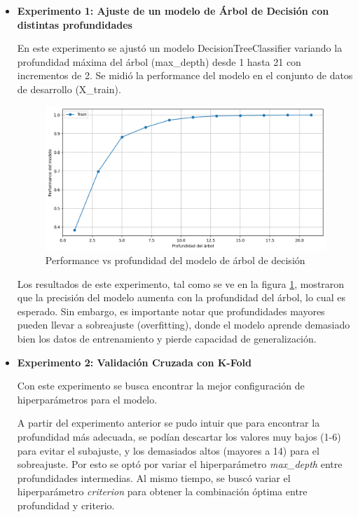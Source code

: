 \documentclass[11pt,a4paper, twocolumn]{article}
\begin{document}
\begin{itemize}
	\item[]
		\textbf{Experimento 1: Ajuste de un modelo de Árbol de Decisión con distintas profundidades}

En este experimento se ajustó un modelo DecisionTreeClassifier variando la profundidad máxima del árbol (max\_depth) desde 1 hasta 21 con incrementos de 2. Se midió la performance del modelo en el conjunto de datos de desarrollo (X\_train).

\begin{figure}[H]
	\centering
	\includegraphics[scale=0.6]{figuras/3b.png}
	\caption{Performance vs profundidad del modelo de árbol de decisión}
	\label{fig:3b}
\end{figure}

Los resultados de este experimento, tal como se ve en la figura \ref{fig:3b}, mostraron que la precisión del modelo aumenta con la profundidad del árbol, lo cual es esperado. Sin embargo, es importante notar que profundidades mayores pueden llevar a sobreajuste (overfitting), donde el modelo aprende demasiado bien los datos de entrenamiento y pierde capacidad de generalización. 

	\item[]
		\textbf{Experimento 2: Validación Cruzada con K-Fold }
 
Con este experimento se busca encontrar la mejor configuración de hiperparámetros para el modelo. 

A partir del experimento anterior se pudo intuir que para encontrar la profundidad más adecuada, se podían descartar los valores muy bajos (1-6) para evitar el subajuste, y los demasiados altos (mayores a 14) para el sobreajuste. Por esto se optó por variar el hiperparámetro \textit{max\_depth} entre profundidades intermedias. 
Al mismo tiempo, se buscó variar el hiperparámetro \textit{criterion} para obtener la combinación óptima entre profundidad y criterio. 


\end{itemize}
\end{document}
